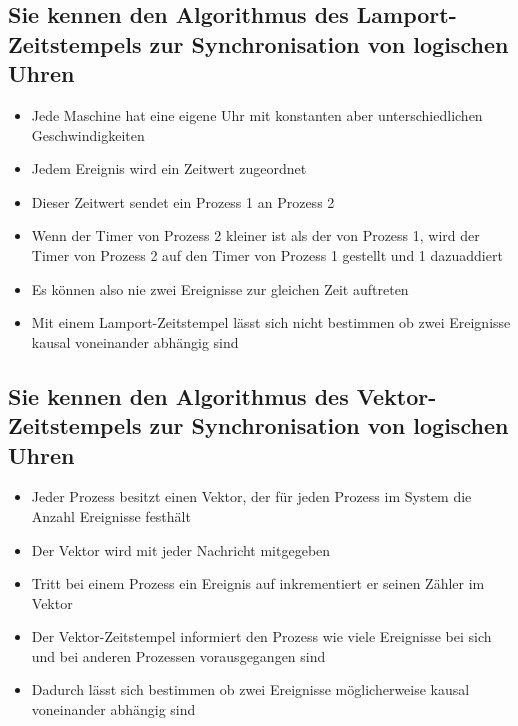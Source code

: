 \subsection{Sie kennen den Algorithmus des Lamport-Zeitstempels zur Synchronisation von logischen Uhren}

\begin{itemize}
	\item Jede Maschine hat eine eigene Uhr mit konstanten aber unterschiedlichen Geschwindigkeiten
	\item Jedem Ereignis wird ein Zeitwert zugeordnet
	\item Dieser Zeitwert sendet ein Prozess 1 an Prozess 2
	\item Wenn der Timer von Prozess 2 kleiner ist als der von Prozess 1, wird der Timer von Prozess 2 auf den Timer von Prozess 1 gestellt und 1 dazuaddiert
	\item Es können also nie zwei Ereignisse zur gleichen Zeit auftreten
	\item Mit einem Lamport-Zeitstempel lässt sich nicht bestimmen ob zwei Ereignisse kausal voneinander abhängig sind
\end{itemize}


\subsection{Sie kennen den Algorithmus des Vektor-Zeitstempels zur Synchronisation von logischen Uhren}

\begin{itemize}
	\item Jeder Prozess besitzt einen Vektor, der für jeden Prozess im System die Anzahl Ereignisse festhält
	\item Der Vektor wird mit jeder Nachricht mitgegeben
	\item Tritt bei einem Prozess ein Ereignis auf inkrementiert er seinen Zähler im Vektor
	\item Der Vektor-Zeitstempel informiert den Prozess wie viele Ereignisse bei sich und bei anderen Prozessen vorausgegangen sind
	\item Dadurch lässt sich bestimmen ob zwei Ereignisse möglicherweise kausal voneinander abhängig sind
\end{itemize}


